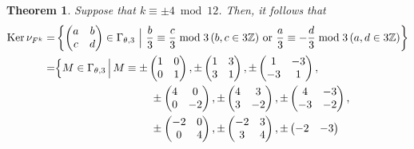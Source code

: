 \documentclass[12pt]{article}
\theoremstyle{definition}
\newtheorem{theorem}{Theorem}
\numberwithin{equation}{section}
\numberwithin{theorem}{section}
\newcommand{\Ker}{\operatorname{Ker}}
\begin{document}
\begin{theorem}
\label{thmk=4-level3}
{\it
Suppose that 
$k\equiv \pm 4 \bmod{12}$. 
Then, it follows that 
\begin{align*}
\Ker \nu_{F^{k}}
=&
\left\{
\begin{pmatrix}
a & b \\
c & d
\end{pmatrix} 
\in\Gamma_{\theta,3} \,\,\Big| \,\,
\frac{b}{3} \equiv\frac{c}{3} \bmod{3}  \, (b,c\in3\mathbb{Z}) \,\,
\mathrm{or} \,\,
\frac{a}{3}\equiv-\frac{d}{3} \bmod{3} \, (a,d\in3\mathbb{Z})
\right\} \\
=&
\Big\{
M
\in
\Gamma_{\theta,3} \,\Big| \, 
M \equiv 
\pm
\begin{pmatrix}
1 & 0 \\
0 & 1
\end{pmatrix}, 
\pm
\begin{pmatrix}
1 & 3 \\
3 & 1
\end{pmatrix}, 
\pm
\begin{pmatrix}
1 & -3 \\
-3 & 1
\end{pmatrix},   \\
&\hspace{31mm}
\pm
\begin{pmatrix}
4 & 0 \\
0 & -2
\end{pmatrix},  
\pm
\begin{pmatrix}
4 & 3 \\
3 & -2
\end{pmatrix}, 
\pm
\begin{pmatrix}
4 & -3 \\
-3 & -2
\end{pmatrix}, \notag \\
&\hspace{31mm}
\pm
\begin{pmatrix}
-2 & 0 \\
0 & 4
\end{pmatrix}, 
\pm
\begin{pmatrix}
-2 & 3 \\
3 & 4
\end{pmatrix}, 
\pm
\begin{pmatrix}
-2 & -3 \\

\end{pmatrix}
\end{align*}}
\end{theorem}
\end{document}
